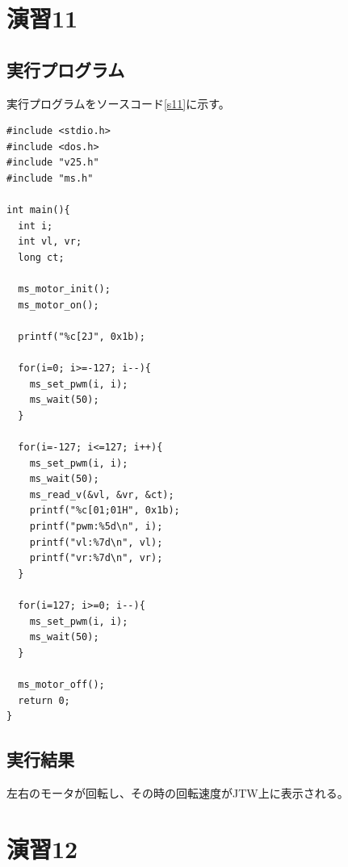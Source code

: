 \section{演習11}
\subsection{実行プログラム}
実行プログラムをソースコード\ref{s11}に示す。

\begin{lstlisting}[caption=演習11のプログラム,label=s11]
#include <stdio.h>
#include <dos.h>
#include "v25.h"
#include "ms.h"

int main(){
  int i;
  int vl, vr;
  long ct;
  
  ms_motor_init();
  ms_motor_on();
  
  printf("%c[2J", 0x1b);
  
  for(i=0; i>=-127; i--){
    ms_set_pwm(i, i);
    ms_wait(50);
  }
  
  for(i=-127; i<=127; i++){
    ms_set_pwm(i, i);
    ms_wait(50);
    ms_read_v(&vl, &vr, &ct);
    printf("%c[01;01H", 0x1b);
    printf("pwm:%5d\n", i);
    printf("vl:%7d\n", vl);
    printf("vr:%7d\n", vr);
  }
  
  for(i=127; i>=0; i--){
    ms_set_pwm(i, i);
    ms_wait(50);
  }
  
  ms_motor_off();
  return 0;
}
\end{lstlisting}

\subsection{実行結果}
左右のモータが回転し、その時の回転速度がJTW上に表示される。

\section{演習12}
